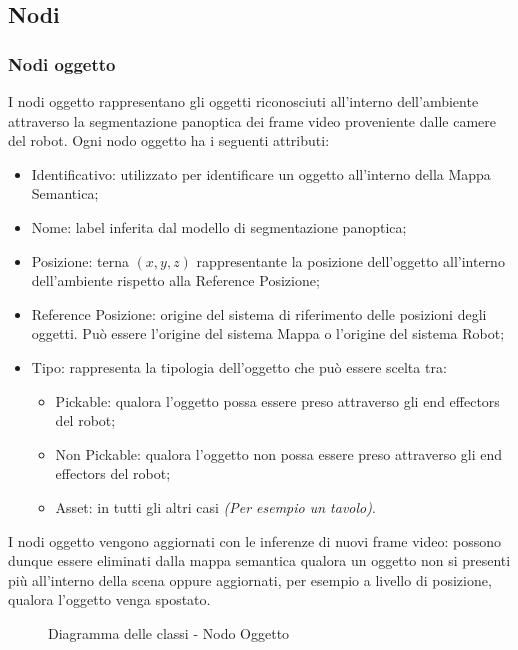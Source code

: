 \subsection{Nodi}
\subsubsection{Nodi oggetto}

I nodi oggetto rappresentano gli oggetti riconosciuti all'interno dell'ambiente attraverso la segmentazione panoptica dei frame video proveniente dalle camere del robot. Ogni nodo oggetto ha i seguenti attributi:
\begin{itemize}
  \item Identificativo: utilizzato per identificare un oggetto all'interno della Mappa Semantica;
  \item Nome: label inferita dal modello di segmentazione panoptica;
  \item Posizione: terna $(x, y, z)$ rappresentante la posizione dell'oggetto all'interno dell'ambiente rispetto alla Reference Posizione;
  \item Reference Posizione: origine del sistema di riferimento delle posizioni degli oggetti. Può essere l'origine del sistema Mappa o l'origine del sistema Robot;
  \item Tipo: rappresenta la tipologia dell'oggetto che può essere scelta tra:
  \begin{itemize}
    \item Pickable: qualora l'oggetto possa essere preso attraverso gli end effectors del robot;
    \item Non Pickable: qualora l'oggetto non possa essere preso attraverso gli end effectors del robot;
    \item Asset: in tutti gli altri casi \textit{(Per esempio un tavolo)}.
  \end{itemize}
\end{itemize}
I nodi oggetto vengono aggiornati con le inferenze di nuovi frame video: possono dunque essere eliminati dalla mappa semantica qualora un oggetto non si presenti più all'interno della scena oppure aggiornati, per esempio a livello di posizione, qualora l'oggetto venga spostato.

\begin{figure}[h]
  \centering
  \caption{Diagramma delle classi - Nodo Oggetto}
\end{figure}

